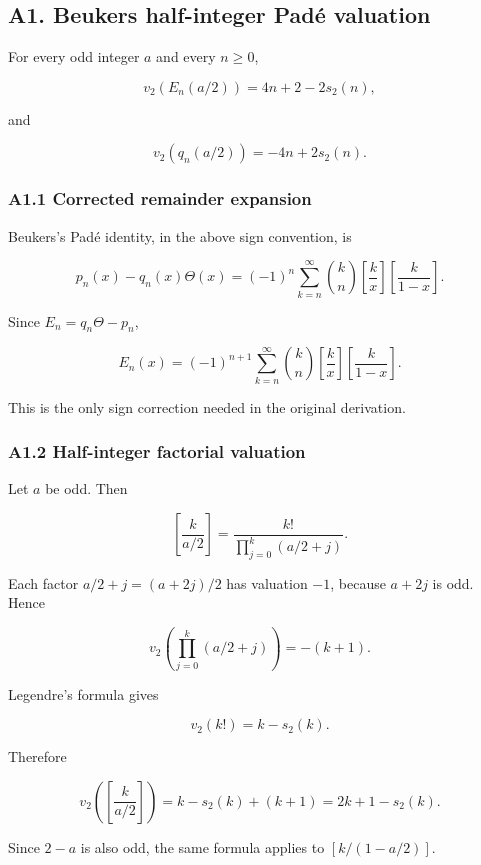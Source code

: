 \documentclass[
  10pt,
  letterpaper,
]{article}
\theoremstyle{definition}
\theoremstyle{remark}
\begin{document}
\subsection{A1. Beukers half-integer Padé
valuation}\label{a1.-beukers-half-integer-paduxe9-valuation}

For every odd integer \(a\) and every \(n\ge0\),

\[
\boxed{
v_2(E_n(a/2))=4n+2-2s_2(n),
}
\]

and

\[
\boxed{
v_2(q_n(a/2))=-4n+2s_2(n).
}
\]

\subsubsection{A1.1 Corrected remainder
expansion}\label{a1.1-corrected-remainder-expansion}

Beukers's Padé identity, in the above sign convention, is

\[
p_n(x)-q_n(x)\Theta(x)
=
(-1)^n
\sum_{k=n}^{\infty}
\binom{k}{n}
\left[\frac{k}{x}\right]
\left[\frac{k}{1-x}\right].
\]

Since \(E_n=q_n\Theta-p_n\),

\[
\boxed{
E_n(x)
=
(-1)^{n+1}
\sum_{k=n}^{\infty}
\binom{k}{n}
\left[\frac{k}{x}\right]
\left[\frac{k}{1-x}\right].
}
\tag{A1}
\]

This is the only sign correction needed in the original derivation.

\subsubsection{A1.2 Half-integer factorial
valuation}\label{a1.2-half-integer-factorial-valuation}

Let \(a\) be odd. Then

\[
\left[\frac{k}{a/2}\right]
=
\frac{k!}{\prod_{j=0}^{k}(a/2+j)}.
\]

Each factor \(a/2+j=(a+2j)/2\) has valuation \(-1\), because \(a+2j\) is
odd. Hence

\[
v_2\!\left(\prod_{j=0}^{k}(a/2+j)\right)=-(k+1).
\]

Legendre's formula gives

\[
v_2(k!)=k-s_2(k).
\]

Therefore

\[
\boxed{
v_2\!\left(\left[\frac{k}{a/2}\right]\right)
=
k-s_2(k)+(k+1)
=
2k+1-s_2(k).
}
\tag{A2}
\]

Since \(2-a\) is also odd, the same formula applies to
\(\left[k/(1-a/2)\right]\).
\end{document}
